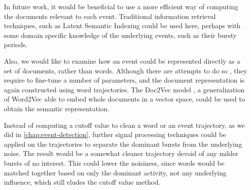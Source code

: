 In future work, it would be beneficial to use a more efficient way of computing the documents relevant to each event. Traditional information retrieval techniques, such as Latent Semantic Indexing \citep{lsi} could be used here, perhaps with some domain specific knowledge of the underlying events, such as their bursty periods.

Also, we would like to examine how an event could be represented directly as a set of documents, rather than words. Although there are attempts to do so \citep{document-bursty-representation}, they require to fine-tune a number of parameters, and the document representation is again constructed using word trajectories. The Doc2Vec model \citep{doc2vec}, a generalization of Word2Vec able to embed whole documents in a vector space, could be used to obtain the semantic representation.

Instead of computing a cutoff value to clean a word or an event trajectory, as we did in \autoref{chap:event-detection}, further signal processing techniques could be applied on the trajectories to separate the dominant bursts from the underlying noise. The result would be a somewhat cleaner trajectory devoid of any milder bursts of no interest. This could lower the noisiness, since words would be matched together based on only the dominant activity, not any underlying influence, which still eludes the cutoff value method.